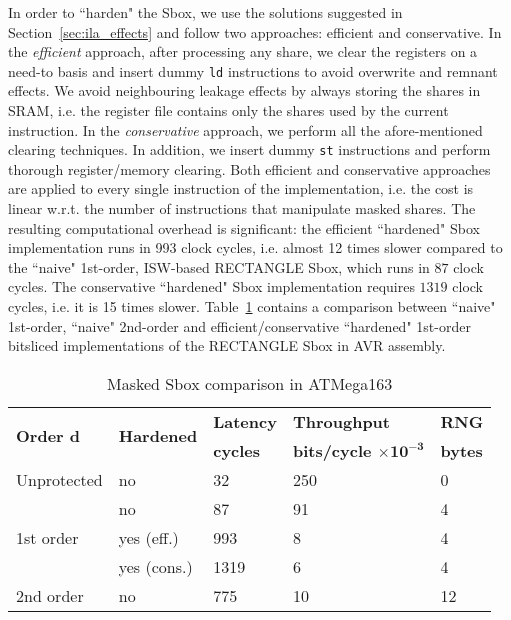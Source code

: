 In order to ``harden" the Sbox, we use the solutions suggested in Section~\ref{sec:ila_effects} 
and follow two approaches: efficient and conservative. 
In the \emph{efficient} approach, after processing any share, 
we clear the registers on a need-to basis and insert dummy \texttt{ld} instructions 
to avoid overwrite and remnant effects. We avoid neighbouring leakage effects by always 
storing the shares in SRAM, i.e. the register file contains only the shares used by 
the current instruction. In the \emph{conservative} approach, we perform all the 
afore-mentioned clearing techniques. In addition, we insert dummy \texttt{st} 
instructions and perform thorough register/memory clearing. Both efficient and 
conservative approaches are applied to every single instruction of the implementation, 
i.e. the cost is linear w.r.t. the number of instructions that manipulate masked shares. 
The resulting computational overhead is significant: the efficient ``hardened" 
Sbox implementation runs in 993 clock cycles, i.e. almost 12 times slower compared 
to the ``naive" 1st-order, ISW-based RECTANGLE Sbox, which runs in $87$ clock cycles. 
The conservative ``hardened" Sbox implementation requires $1319$ clock cycles, i.e. it 
is 15 times slower. Table~\ref{cc_table} contains a comparison between ``naive" 1st-order, 
``naive" 2nd-order and efficient/conservative ``hardened" 1st-order bitsliced implementations 
of the RECTANGLE Sbox in AVR assembly.

\begin{table}[H]
\centering
\caption{Masked Sbox comparison in ATMega163}
\label{cc_table}
\begin{tabular}{ |l|l|l|l|l|}
\hline
\multirow{2}{*}{\textbf{Order $\mathbf{d}$}} & \multirow{2}{*}{\textbf{Hardened}} & \textbf{Latency}& \textbf{Throughput} & \textbf{RNG} \\
		& & \textbf{cycles} &   \textbf{bits/cycle $\mathbf{\times 10^{-3}}$} & \textbf{bytes} \\ \hline \hline 
Unprotected  & no & 32 & 250 & 0 \\ \hline
\multirow{3}{*}{1st order}&   no & 87 & 91 &  4\\ \cline{2-5}
       			 &   yes (eff.)& 993 & 8 & 4\\ \cline{2-5}
 		      	 &   yes (cons.) & 1319 & 6 & 4\\ \hline
 2nd order     	 &   no  & 775 & 10 & 12\\ \hline
\end{tabular}
\end{table}

